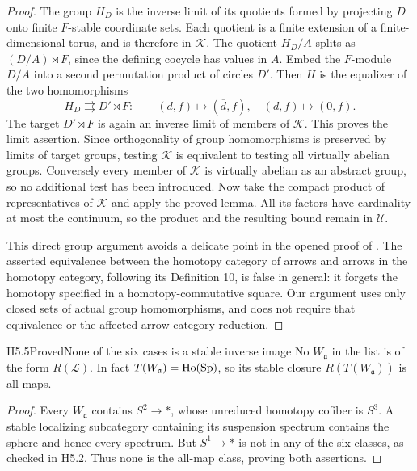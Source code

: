 \begin{proof}
The group $H_D$ is the inverse limit of its quotients formed
by projecting $D$ onto finite $F$-stable coordinate sets.
Each quotient is a finite extension of a finite-dimensional
torus, and is therefore in $\mathcal K$. The quotient
$H_D/A$ splits as $(D/A)\rtimes F$, since the defining
cocycle has values in $A$. Embed the $F$-module $D/A$ into a
second permutation product of circles $D'$. Then $H$ is the
equalizer of the two homomorphisms
\[
 H_D\rightrightarrows D'\rtimes F:
 \qquad
 (d,f)\longmapsto(\overline d,f),\quad
 (d,f)\longmapsto(0,f).
                                                        \tag{H5.4.1}
\]
The target $D'\rtimes F$ is again an inverse limit of members
of $\mathcal K$. This proves the limit assertion. Since
orthogonality of group homomorphisms is preserved by limits
of target groups, testing $\mathcal K$ is equivalent to
testing all virtually abelian groups. Conversely every
member of $\mathcal K$ is virtually abelian as an abstract
group, so no additional test has been introduced.
Now take the compact product of representatives
of $\mathcal K$ and apply the proved lemma.
All its factors have cardinality at most the
continuum, so the product and the resulting
bound remain in $\mathcal U$.

This direct group argument avoids a delicate
point in the opened proof of
\citet[Theorem 19]{EH5Przezdziecki2002}.
The asserted equivalence between the homotopy
category of arrows and arrows in the homotopy
category, following its Definition 10, is
false in general: it forgets the homotopy
specified in a homotopy-commutative square.
Our argument uses only closed sets of actual
group homomorphisms, and does not require
that equivalence or the affected arrow
category reduction.
\end{proof}

\begin{claim}{H5.5}{Proved}{None of the six cases is a stable inverse image}
No $W_{\mathfrak a}$ in the list is of the form $R(\mathcal L)$.
In fact $T(W_{\mathfrak a})=\operatorname{Ho}(\mathrm{Sp})$, so its stable
closure $R(T(W_{\mathfrak a}))$ is all maps.
\end{claim}
\begin{proof}
Every $W_{\mathfrak a}$ contains $S^2\to *$, whose unreduced
homotopy cofiber is $S^3$. A stable localizing subcategory
containing its suspension spectrum contains the sphere and
hence every spectrum. But $S^1\to *$ is not in any of the
six classes, as checked in H5.2. Thus none is the all-map
class, proving both assertions.
\end{proof}

